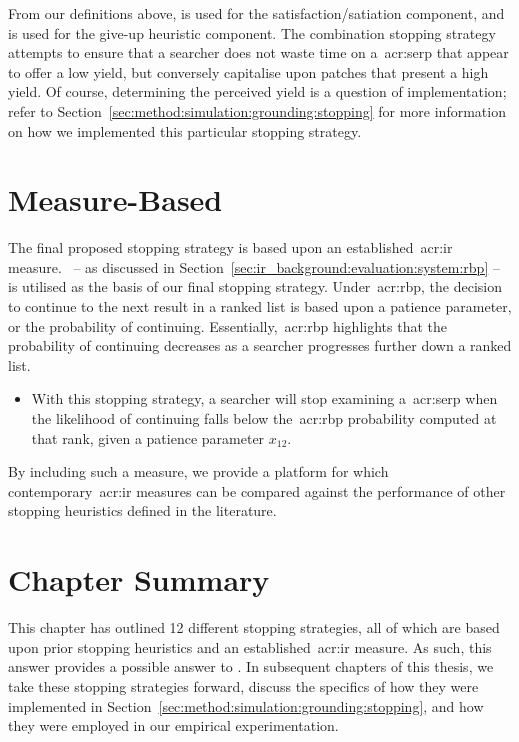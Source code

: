 From our definitions above,  is used for the satisfaction/satiation component, and  is used for the give-up heuristic component. The combination stopping strategy attempts to ensure that a searcher does not waste time on a~\gls{acr:serp} that appear to offer a low yield, but conversely capitalise upon patches that present a high yield. Of course, determining the perceived yield is a question of implementation; refer to Section~\ref{sec:method:simulation:grounding:stopping} for more information on how we implemented this particular stopping strategy.

\section{Measure-Based}
The final proposed stopping strategy is based upon an established~\gls{acr:ir} measure.~ -- as discussed in Section~\ref{sec:ir_background:evaluation:system:rbp} -- is utilised as the basis of our final stopping strategy. Under~\gls{acr:rbp}, the decision to continue to the next result in a ranked list is based upon a patience parameter, or the probability of continuing. Essentially,~\gls{acr:rbp} highlights that the probability of continuing decreases as a searcher progresses further down a ranked list.

\begin{itemize}
    
    \item{ With this stopping strategy, a searcher will stop examining a~\gls{acr:serp} when the likelihood of continuing falls below the~\gls{acr:rbp} probability computed at that rank, given a patience parameter $x_{12}$.}
    
\end{itemize}

By including such a measure, we provide a platform for which contemporary~\gls{acr:ir} measures can be compared against the performance of other stopping heuristics defined in the literature.

\section{Chapter Summary}
This chapter has outlined 12 different stopping strategies, all of which are based upon prior stopping heuristics and an established~\gls{acr:ir} measure. As such, this answer provides a possible answer to . In subsequent chapters of this thesis, we take these stopping strategies forward, discuss the specifics of how they were implemented in Section~\ref{sec:method:simulation:grounding:stopping}, and how they were employed in our empirical experimentation.